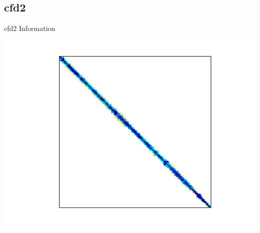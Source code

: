 \subsection{cfd2}
\begin{table}[h!]
	\begin{minipage}{0.5\linewidth}
		\caption{cfd2 Information}
		\label{table:cfd2}
		\centering
        
	\end{minipage}\hfill
	\begin{minipage}{0.45\linewidth}
		\centering
		\includegraphics[width=1\textwidth]{figs/cfd2.png}
		\label{fig:cfd2}
	\end{minipage}
\end{table}


